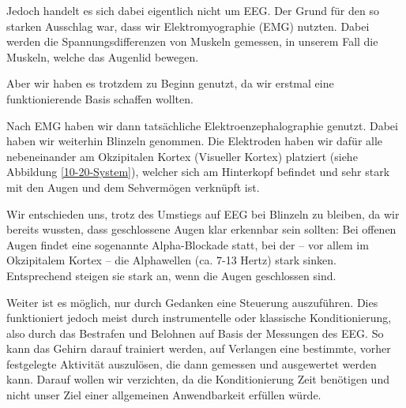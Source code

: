 \documentclass[11pt]{scrartcl}
\begin{document}
	Jedoch handelt es sich dabei eigentlich nicht um EEG. Der Grund für den so starken Ausschlag war, dass wir Elektromyographie (EMG) nutzten. Dabei werden die Spannungsdifferenzen von Muskeln gemessen, in unserem Fall die Muskeln, welche das Augenlid bewegen. \cite{wiki:EMG}

	Aber wir haben es trotzdem zu Beginn genutzt, da wir erstmal eine funktionierende Basis schaffen wollten.

	Nach EMG haben wir dann tatsächliche Elektroenzephalographie genutzt. Dabei haben wir weiterhin Blinzeln genommen. Die Elektroden haben wir dafür alle nebeneinander am Okzipitalen Kortex (Visueller Kortex) platziert (siehe Abbildung \ref{10-20-System}), welcher sich am Hinterkopf befindet und sehr stark mit den Augen und dem Sehvermögen verknüpft ist. \cite{Birbaumer2010} 

	Wir entschieden uns, trotz des Umstiegs auf EEG bei Blinzeln zu bleiben, da wir bereits wussten, dass geschlossene Augen klar erkennbar sein sollten: Bei offenen Augen findet eine sogenannte Alpha-Blockade statt, bei der -- vor allem im Okzipitalem Kortex -- die Alphawellen (ca. 7-13 Hertz) stark sinken. Entsprechend steigen sie stark an, wenn die Augen geschlossen sind. \cite{Springer:Berger} \cite{Praktikum} \cite{wiki:Berger-Effekt}

	Weiter ist es möglich, nur durch Gedanken eine Steuerung auszuführen. Dies funktioniert jedoch meist durch instrumentelle oder klassische Konditionierung, also durch das Bestrafen und Belohnen auf Basis der Messungen des EEG. So kann das Gehirn darauf trainiert werden, auf Verlangen eine bestimmte, vorher festgelegte Aktivität auszulösen, die dann gemessen und ausgewertet werden kann. \cite{BCIChaudhary} Darauf wollen wir verzichten, da die Konditionierung Zeit benötigen und nicht unser Ziel einer allgemeinen Anwendbarkeit erfüllen würde.

\end{document}
